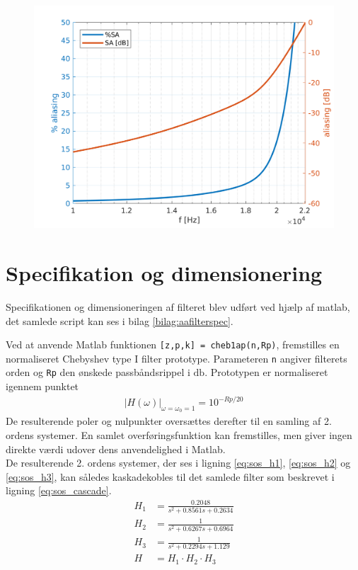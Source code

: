 \begin{figure}[h!]
	\centering
	\includegraphics[width=.8\textwidth]{matlab/filter_sa.png}
	\caption{}
	\label{fig:filter_sa}
\end{figure}


\section{Specifikation og dimensionering}\label{sec:filter_spec}
Specifikationen og dimensioneringen af filteret blev udført ved hjælp af matlab, det samlede script kan ses i bilag \ref{bilag:aafilterspec}.

Ved at anvende Matlab funktionen \texttt{[z,p,k] = cheb1ap(n,Rp)}, fremstilles en normaliseret Chebyshev type I filter prototype. 
Parameteren \texttt{n} angiver filterets orden og \texttt{Rp} den ønskede passbåndsrippel i $\si{\decibel}$. 
Prototypen er normaliseret igennem punktet
\begin{align}
 |H(\omega)|_{\omega=\omega_0=1}=10^{-Rp/20}
\end{align}
De resulterende poler og nulpunkter oversættes derefter til en samling af 2. ordens systemer. 
En samlet overføringsfunktion kan fremstilles, men giver ingen direkte værdi udover dens anvendelighed i Matlab.
\\
De resulterende 2. ordens systemer, der ses i ligning \ref{eq:sos_h1}, \ref{eq:sos_h2} og \ref{eq:sos_h3}, kan således kaskadekobles til det samlede filter som beskrevet i ligning \ref{eq:sos_cascade}. 
\begin{align}
H_1 &= \frac{\num{0.2048}}{s^2 + \num{0.8561} s + \num{0.2634}} \label{eq:sos_h1}\\
H_2 &= \frac{\num{1}}{s^2 + \num{0.6267} s + \num{0.6964}} \label{eq:sos_h2}\\
H_3 &= \frac{\num{1}}{s^2 + \num{0.2294} s + \num{1.129}} \label{eq:sos_h3}\\
H &= H_1 \cdot H_2 \cdot H_3 \label{eq:sos_cascade}
\end{align}


